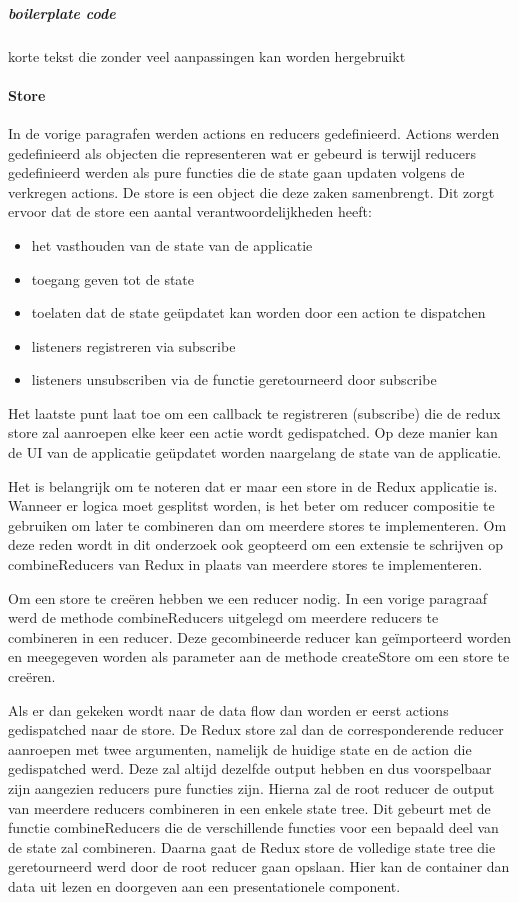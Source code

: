 \subparagraph{boilerplate code}
korte tekst die zonder veel aanpassingen kan worden hergebruikt

\paragraph{Store}
In de vorige paragrafen werden actions en reducers gedefinieerd. Actions werden gedefinieerd als objecten die representeren wat er gebeurd is terwijl reducers gedefinieerd werden als pure functies die de state gaan updaten volgens de verkregen actions. De store is een object die deze zaken samenbrengt. Dit zorgt ervoor dat de store een aantal verantwoordelijkheden heeft:

\begin{itemize}
	\item het vasthouden van de state van de applicatie
	\item toegang geven tot de state
	\item toelaten dat de state geüpdatet kan worden door een action te dispatchen
	\item listeners registreren via subscribe
	\item listeners unsubscriben via de functie geretourneerd door subscribe
\end{itemize}

Het laatste punt laat toe om een callback te registreren (subscribe) die de redux store zal aanroepen elke keer een actie wordt gedispatched. Op deze manier kan de UI van de applicatie geüpdatet worden naargelang de state van de applicatie. 

Het is belangrijk om te noteren dat er maar een store in de Redux applicatie is. Wanneer er logica moet gesplitst worden, is het beter om reducer compositie te gebruiken om later te combineren dan om meerdere stores te implementeren. Om deze reden wordt in dit onderzoek ook geopteerd om een extensie te schrijven op combineReducers van Redux in plaats van meerdere stores te implementeren.

Om een store te creëren hebben we een reducer nodig. In een vorige paragraaf werd de methode combineReducers uitgelegd om meerdere reducers te combineren in een reducer. Deze gecombineerde reducer kan geïmporteerd worden en meegegeven worden als parameter aan de methode createStore om een store te creëren.

Als er dan gekeken wordt naar de data flow dan worden er eerst actions gedispatched naar de store. De Redux store zal dan de corresponderende reducer aanroepen met twee argumenten, namelijk de huidige state en de action die gedispatched werd. Deze zal altijd dezelfde output hebben en dus voorspelbaar zijn aangezien reducers pure functies zijn. Hierna zal de root reducer de output van meerdere reducers combineren in een enkele state tree. Dit gebeurt met de functie combineReducers die de verschillende functies voor een bepaald deel van de state zal combineren. Daarna gaat de Redux store de volledige state tree die geretourneerd werd door de root reducer gaan opslaan. Hier kan de container dan data uit lezen en doorgeven aan een presentationele component.
\autocite{Redux02}

